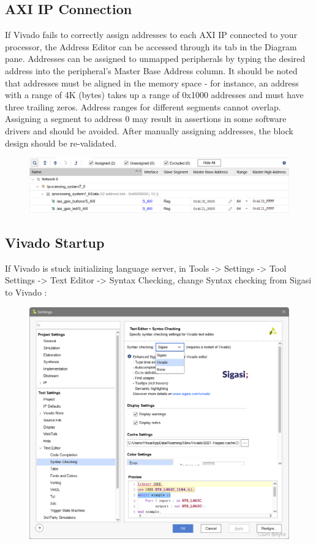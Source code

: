 \documentclass[a4paper,12pt,twoside]{article}
\begin{document}
\subsection{AXI IP Connection}\label{AA5}
If Vivado fails to correctly assign addresses to each AXI IP connected to your processor, the Address Editor can be accessed through its tab in the Diagram pane. Addresses can be assigned to unmapped peripherals by typing the desired address into the peripheral's Master Base Address column. It should be noted that addresses must be aligned in the memory space - for instance, an address with a range of 4K (bytes) takes up a range of 0x1000 addresses and must have three trailing zeros. Address ranges for different segments cannot overlap. Assigning a segment to address 0 may result in assertions in some software drivers and should be avoided. After manually assigning addresses, the block design should be re-validated.
\begin{figure}[H]
    \centering
    \includegraphics[width=\textwidth]{images/21.png}
\end{figure}
\subsection{Vivado Startup}\label{AA6}
If Vivado is stuck initializing language server, in Tools -> Settings -> Tool Settings -> Text Editor -> Syntax Checking, change Syntax checking from Sigasi to Vivado \cite{vivadostart}:
\begin{figure}[H]
    \centering
    \includegraphics[width=\textwidth]{images/22.png}
\end{figure}

\printbibliography
\end{document}
